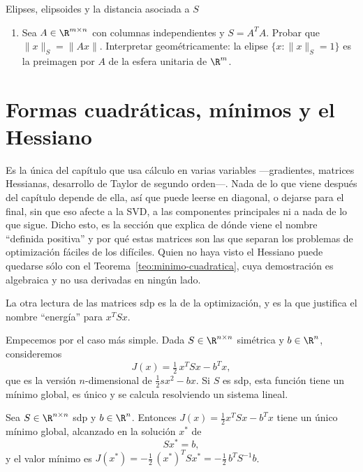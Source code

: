 \begin{entrega}{Elipses, elipsoides y la distancia asociada a $S$}
\begin{enumerate}[label=\textbf{(\alph*)},itemsep=3pt,topsep=4pt]
\item Sea $A\in\R^{m\times n}$ con columnas independientes y $S=A^TA$.
Probar que $\|x\|_S = \|Ax\|$. Interpretar geométricamente: la elipse
$\{x:\|x\|_S=1\}$ es la preimagen por $A$ de la esfera unitaria de $\R^m$.
\end{enumerate}

\medskip
{}
\end{entrega}

\section{Formas cuadráticas, mínimos y el Hessiano}
\label{sec:minimos}

\begin{remark}\label{obs:seccion-opcional}
Es la única del capítulo que usa cálculo en varias variables ---gradientes,
matrices Hessianas, desarrollo de Taylor de segundo orden---. Nada de lo que
viene después del capítulo depende de ella, así que puede leerse en diagonal,
o dejarse para el final, sin que eso afecte a la SVD, a las componentes
principales ni a nada de lo que sigue. Dicho esto, es la sección que explica
de dónde viene el nombre ``definida positiva'' y por qué estas matrices son
las que separan los problemas de optimización fáciles de los difíciles.
Quien no haya visto el Hessiano puede quedarse sólo con el
Teorema~\ref{teo:minimo-cuadratica}, cuya demostración es algebraica y no usa
derivadas en ningún lado.
\end{remark}

La otra lectura de las matrices sdp es la de la optimización, y es la que
justifica el nombre ``energía'' para $x^TSx$.

Empecemos por el caso más simple. Dada $S\in\R^{n\times n}$ simétrica y
$b\in\R^n$, consideremos
\[
J(x) = \tfrac12\, x^TSx - b^Tx ,
\]
que es la versión $n$-dimensional de $\frac12 sx^2-bx$. Si $S$ es sdp, esta
función tiene un mínimo global, es único y se calcula resolviendo un sistema
lineal.

\begin{theorem}\label{teo:minimo-cuadratica}
Sea $S\in\R^{n\times n}$ sdp y $b\in\R^n$. Entonces $J(x)=\frac12x^TSx-b^Tx$
tiene un único mínimo global, alcanzado en la solución $x^*$ de
\[
S x^* = b ,
\]
y el valor mínimo es $J(x^*) = -\frac12\,(x^*)^TSx^* = -\frac12\, b^TS^{-1}b$.
\end{theorem}

